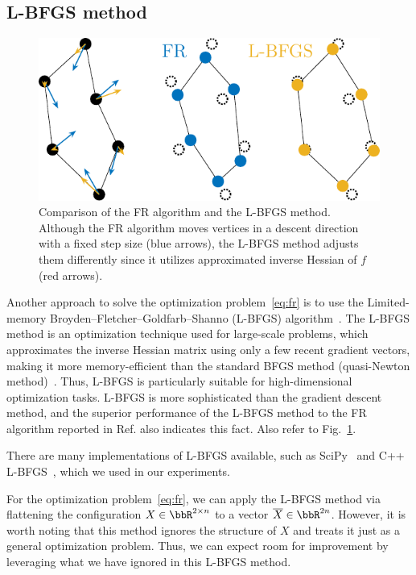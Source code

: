 \documentclass[dvipdfmx,journal]{IEEEtran}
\begin{document}
\subsection{L-BFGS method}\label{ssec:lbfgs}

\begin{figure}[t]
  \centering
  \includegraphics[width=0.713\columnwidth]{comparison/comparison_FRandLBFGS.pdf}
  \caption{
    Comparison of the FR algorithm and the L-BFGS method.
    Although the FR algorithm moves vertices in a descent direction with a fixed step size (blue arrows), the L-BFGS method adjusts them differently since it utilizes approximated inverse Hessian of $f$ (red arrows).
  }
  \label{fig:comparisonFRandLBFGS}
\end{figure}

Another approach to solve the optimization problem~\eqref{eq:fr} is to use the Limited-memory Broyden--Fletcher--Goldfarb--Shanno (L-BFGS) algorithm~\cite{6183577}.
The L-BFGS method is an optimization technique used for large-scale problems, which approximates the inverse Hessian matrix using only a few recent gradient vectors, making it more memory-efficient than the standard BFGS method (quasi-Newton method)~\cite{liuLimitedMemoryBFGS1989}.
Thus, L-BFGS is particularly suitable for high-dimensional optimization tasks. L-BFGS is more sophisticated than the gradient descent method, and the superior performance of the L-BFGS method to the FR algorithm reported in Ref.\cite{6183577} also indicates this fact. Also refer to Fig.~\ref{fig:comparisonFRandLBFGS}.

There are many implementations of L-BFGS available, such as SciPy~\cite{2020SciPy-NMeth} and C++ L-BFGS~\cite{qiuYixuanLBFGSpp2024,okazakiChokkanLiblbfgs2024}, which we used in our experiments.

For the optimization problem~\eqref{eq:fr}, we can apply the L-BFGS method via flattening the configuration $X \in \bbR^{2 \times n}$ to a vector $\overline{X} \in \bbR^{2n}$.
However, it is worth noting that this method ignores the structure of $X$ and treats it just as a general optimization problem.
Thus, we can expect room for improvement by leveraging what we have ignored in this L-BFGS method.
\end{document}
